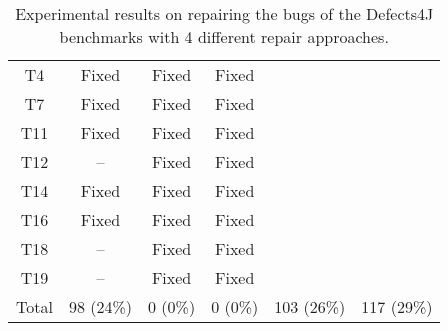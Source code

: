 \begin{table}[!t]
{\begin{tabular}{|c|c|c|c|c|c|}
\hline
T4                & Fixed     & Fixed     &Fixed   \\
T7                & Fixed     & Fixed     &Fixed   \\
T11               & Fixed     & Fixed     &Fixed   \\
T12               & --        & Fixed     &Fixed   \\
T14               & Fixed     & Fixed     &Fixed   \\
T16               & Fixed     & Fixed     &Fixed   \\
T18               & --        & Fixed     &Fixed   \\
T19               & --        & Fixed     &Fixed   \\
\hline
Total             & 98 (24\%) & 0 (0\%)   & 0 (0\%)   & 103 (26\%) & 117 (29\%)\\
\hline 
\end{tabular}%
}
\caption{Experimental results on repairing the bugs of the Defects4J benchmarks with 4 different repair approaches.}
\end{table}
